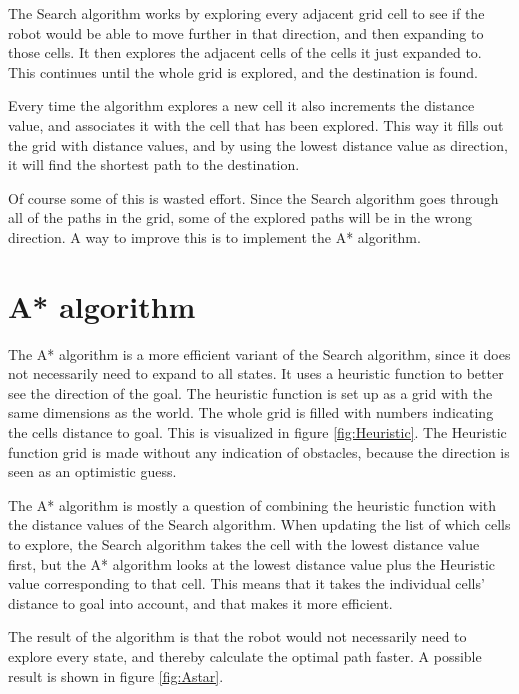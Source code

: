 The Search algorithm works by exploring every adjacent grid cell to see if the robot would be able to move further in that direction, and then expanding to those cells. It then explores the adjacent cells of the cells it just expanded to. This continues until the whole grid is explored, and the destination is found. 

Every time the algorithm explores a new cell it also increments the distance value, and associates it with the cell that has been explored. This way it fills out the grid with distance values, and by using the lowest distance value as direction, it will find the shortest path to the destination. 


Of course some of this is wasted effort. Since the Search algorithm goes through all of the paths in the grid, some of the explored paths will be in the wrong direction. A way to improve this is to implement the A* algorithm.  

\section{A* algorithm}
The A* algorithm is a more efficient variant of the Search algorithm, since it does not necessarily need to expand to all states. It uses a heuristic function to better see the direction of the goal. The heuristic function is set up as a grid with the same dimensions as the world. The whole grid is filled with numbers indicating the cells distance to goal. This is visualized in figure \ref{fig:Heuristic}. The Heuristic function grid is made without any indication of obstacles, because the direction is seen as an optimistic guess.

The A* algorithm is mostly a question of combining the heuristic function with the distance values of the Search algorithm. When updating the list of which cells to explore, the Search algorithm takes the cell with the lowest distance value first, but the A* algorithm looks at the lowest distance value plus the Heuristic value corresponding to that cell. This means that it takes the individual cells' distance to goal into account, and that makes it more efficient. 

The result of the algorithm is that the robot would not necessarily need to explore every state, and thereby calculate the optimal path faster. A possible result is shown in figure \ref{fig:Astar}.


